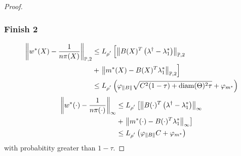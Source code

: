 \begin{proof}
\subsubsection*{Finish 2}
\begin{align}
  \left\lVert
    w^*(X)
    -
    \frac{1}{n \pi(X)}
  \right\rVert_{\mathbb{P}, 2}
  &\le
  L_{\rho^{'}}
  \left[ 
    \left\lVert
      B(X)^T 
      \left(
        \lambda^\dagger
        -
        \lambda^*_1
      \right)
    \right\rVert_{\mathbb{P},2}
    \right.
    \\
    &+
    \left. 
    \left\lVert
      m^*(X)
      -
      B(X)^T 
      \lambda^*_1
    \right\rVert_{\mathbb{P},2}
  \right]
  \\
  &\le
  L_{\rho^{'}}
  \left(
    \varphi_{\left\lVert B\right\rVert}
    \sqrt{
      C^2(1 - \tau)
      +
      \text{diam}(\Theta)^2
      \tau
    } 
    +
    \varphi_{m^*}
  \right)
\end{align}
\begin{align}
  \left\lVert
    w^*(\cdot)
    -
    \frac{1}{n \pi(\cdot)}
  \right\rVert_{\infty}
  &\le
  L_{\rho^{'}}
  \left[ 
    \left\lVert
      B(\cdot)^T 
      \left(
        \lambda^\dagger
        -
        \lambda^*_1
      \right)
    \right\rVert_{\infty}
    \right.
    \\
    &+
    \left. 
    \left\lVert
      m^*(\cdot)
      -
      B(\cdot)^T 
      \lambda^*_1
    \right\rVert_{\infty}
  \right]
  \\
  &\le
  L_{\rho^{'}}
  \left(
    \varphi_{\left\lVert B\right\rVert}
    C
    +
    \varphi_{m^*}
  \right)
\end{align}
with probabitity greater than 
$1 - \tau$.
\end{proof}
